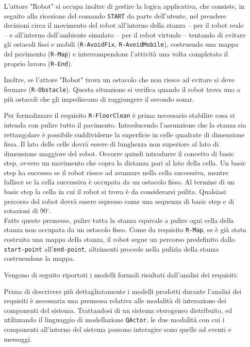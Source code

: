 \documentclass{llncs}
\newcommand{\action}[1]{\texttt{#1}\xspace}
\newcommand{\code}[1]{{\color{blue}\small{\texttt{#1}}}}
\begin{document}
L'attore "Robot" si occupa inoltre di gestire la logica applicativa, che consiste, in seguito alla ricezione del comando \action{START} da parte dell'utente, nel prendere decisioni circa il movimento del robot all'interno della stanza – per il robot reale – e all'interno dell'ambiente simulato – per il robot virtuale – tentando di evitare gli ostacoli fissi e mobili (\code{R-AvoidFix}, \code{R-AvoidMobile}), costruendo una mappa del pavimento (\code{R-Map}) e interrompendone l'attività una volta completato il proprio lavoro (\code{R-End}).

Inoltre, se l'attore "Robot" trova un ostacolo che non riesce ad evitare si deve fermare (\code{R-Obstacle}).
Questa situazione si verifica quando il robot trova uno o più ostacoli che gli impediscono di raggiungere il secondo sonar.

Per formalizzare il requisito \code{R-FloorClean} è prima necessario stabilire cosa si intenda con pulire tutto il pavimento. Introducendo l'assunzione che la stanza sia rettangolare è possibile suddividerne la superficie in celle quadrate di dimensione fissa. Il lato delle celle dovrà essere di lunghezza non superiore al lato di dimensione maggiore del robot. Occorre quindi introdurre il concetto di basic step, ovvero un movimento che copra la distanza pari al lato della cella. Un basic step ha successo se il robot riesce ad avanzare nella cella successiva, mentre fallisce se la cella successiva è occupata da un ostacolo fisso. Al termine di un basic step la cella in cui il robot si trova è da considerarsi pulita. Qualsiasi percorso del robot dovrà essere espresso come una sequenza di basic step e di rotazioni di 90$^{\circ}$. \\ Fatte queste premesse, pulire tutta la stanza equivale a pulire ogni cella della stanza non occupata da un ostacolo fisso. Come da requisito \code{R-Map}, se è già stata costruita una mappa della stanza, il robot segue un percorso predefinito dallo \code{start-point} all'\code{end-point}, altrimenti procede nella pulizia della stanza costruendone la mappa. 

Vengono di seguito riportati i modelli formali risultati dall'analisi dei requisiti:




Prima di descrivere più dettagliatamente i modelli prodotti durante l'analisi dei requisiti è necessaria una premessa relativa alle modalità di interazione dei componenti del sistema. Trattandosi di un sistema eterogeneo distribuito, ed utilizzando il linguaggio di modellazione \action{QActor}, le due modalità con cui i componenti all'interno del sistema possono interagire sono quelle ad eventi e messaggi. 
\end{document}
